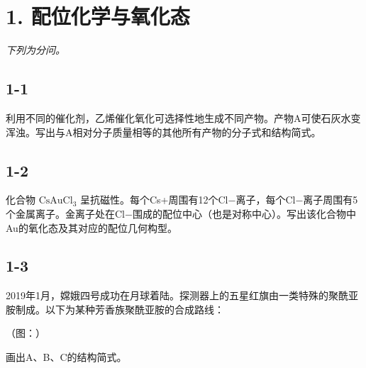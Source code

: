 \section*{1. 配位化学与氧化态}
\textit{下列为分问。}

\subsection*{1-1}
利⽤不同的催化剂，⼄烯催化氧化可选择性地⽣成不同产物。产物A可使⽯灰⽔变浑浊。写出与A相对分⼦质量相等的其他所有产物的分⼦式和结构简式。

\subsection*{1-2}
化合物 $\mathrm { C s A u C l _ { 3 } }$ 呈抗磁性。每个Cs+周围有12个Cl−离⼦，每个Cl−离⼦周围有5个⾦属离⼦。⾦离⼦处在Cl−围成的配位中⼼（也是对称中⼼）。写出该化合物中Au的氧化态及其对应的配位⼏何构型。

\subsection*{1-3}
2019年1⽉，嫦娥四号成功在⽉球着陆。探测器上的五星红旗由⼀类特殊的聚酰亚胺制成。以下为某种芳⾹族聚酰亚胺的合成路线：

（图：）

画出A、B、C的结构简式。
